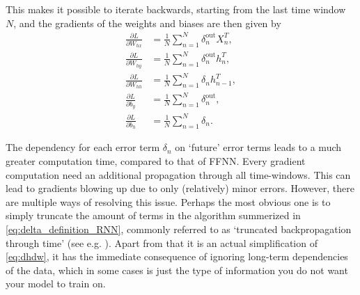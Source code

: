 \documentclass[%
reprint,
amsmath,amssymb,
aps,
]{revtex4-2}
\begin{document}
This makes it possible to iterate backwards, starting from the last time window \(N\), and the gradients of the weights and biases are then given by
\begin{subequations}
\begin{align}
	\frac{\partial L}{\partial W_{hx}} &= \frac{1}{N}\sum\limits_{n=1}^{N}\delta^{\text{out}}_{n} X^{T}_{n}, \\
	\frac{\partial L}{\partial W_{hy}} &= \frac{1}{N}\sum\limits_{n=1}^{N}\delta^{\text{out}}_{n} h^{T}_{n}, \\
	\frac{\partial L}{\partial W_{hh}} &= \frac{1}{N}\sum\limits_{n=1}^{N}\delta_{n} h^{T}_{n-1},\\
	\frac{\partial L}{\partial b_{y}}  &= \frac{1}{N}\sum\limits_{n=1}^{N}\delta^{\text{out}}_{n},\\
	\frac{\partial L}{\partial b_{h}}  &= \frac{1}{N}\sum\limits_{n=1}^{N}\delta_{n}.
\end{align}
\end{subequations}

The dependency for each error term \(\delta_{n}\) on `future' error terms leads to a much greater computation time, compared to that of FFNN. Every gradient computation need an additional propagation through all time-windows. This can lead to gradients blowing up due to only (relatively) minor errors. However, there are multiple ways of resolving this issue. Perhaps the most obvious one is to simply truncate the amount of terms in the algorithm summerized in \eqref{eq:delta_definition_RNN}, commonly referred to as `truncated backpropagation through time' (see e.g. \cite{tallec2017unbiasingtruncatedbackpropagationtime}). Apart from that it is an actual simplification of \eqref{eq:dhdw}, it has the immediate consequence of ignoring long-term dependencies of the data, which in some cases is just the type of information you do not want your model to train on. 
\end{document}
